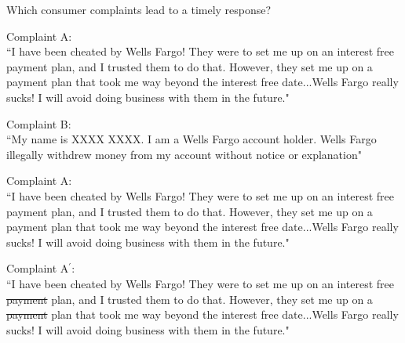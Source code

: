 \documentclass[xcolor=dvipsnames]{beamer}
\begin{document}
\begin{frame}

\huge

Which consumer complaints lead to a timely response?

\end{frame}



\begin{frame}

Complaint A:\\
``I have been cheated by Wells Fargo! They were to set me up on an interest free payment plan, and I trusted them to do that. However, they set me up on a payment plan that took me way beyond the interest free date...Wells Fargo really sucks! I will avoid doing business with them in the future."

\vspace{0.25in}

Complaint B: \\
``My name is XXXX XXXX. I am a Wells Fargo account holder. Wells Fargo illegally withdrew money from my account without notice or explanation"

\pause
\vspace{0.125in}
\Large
{}



\end{frame}


\begin{frame}

Complaint A:\\
``I have been cheated by Wells Fargo! They were to set me up on an interest free \alert{payment} plan, and I trusted them to do that. However, they set me up on a \alert{payment} plan that took me way beyond the interest free date...Wells Fargo really sucks! I will avoid doing business with them in the future."

\vspace{0.25in}

Complaint A$^{'}$: \\
``I have been cheated by Wells Fargo! They were to set me up on an interest free \sout{\alert{payment}} plan, and I trusted them to do that. However, they set me up on a \sout{\alert{payment}} plan that took me way beyond the interest free date...Wells Fargo really sucks! I will avoid doing business with them in the future."

\pause
\vspace{0.125in}


\end{frame}
\end{document}
